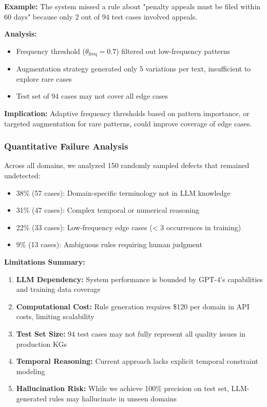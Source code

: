 \documentclass[runningheads]{llncs}
\begin{document}
\textbf{Example:} The system missed a rule about "penalty appeals must be filed within 60 days" because only 2 out of 94 test cases involved appeals.

\textbf{Analysis:}
\begin{itemize}
    \item Frequency threshold ($\theta_{\text{freq}} = 0.7$) filtered out low-frequency patterns
    \item Augmentation strategy generated only 5 variations per text, insufficient to explore rare cases
    \item Test set of 94 cases may not cover all edge cases
\end{itemize}

\textbf{Implication:} Adaptive frequency thresholds based on pattern importance, or targeted augmentation for rare patterns, could improve coverage of edge cases.

\subsubsection{Quantitative Failure Analysis}

Across all domains, we analyzed 150 randomly sampled defects that remained undetected:
\begin{itemize}
    \item 38\% (57 cases): Domain-specific terminology not in LLM knowledge
    \item 31\% (47 cases): Complex temporal or numerical reasoning
    \item 22\% (33 cases): Low-frequency edge cases (< 3 occurrences in training)
    \item 9\% (13 cases): Ambiguous rules requiring human judgment
\end{itemize}

\textbf{Limitations Summary:}
\begin{enumerate}
    \item \textbf{LLM Dependency:} System performance is bounded by GPT-4's capabilities and training data coverage
    \item \textbf{Computational Cost:} Rule generation requires \$120 per domain in API costs, limiting scalability
    \item \textbf{Test Set Size:} 94 test cases may not fully represent all quality issues in production KGs
    \item \textbf{Temporal Reasoning:} Current approach lacks explicit temporal constraint modeling
    \item \textbf{Hallucination Risk:} While we achieve 100\% precision on test set, LLM-generated rules may hallucinate in unseen domains
\end{enumerate}
\end{document}
